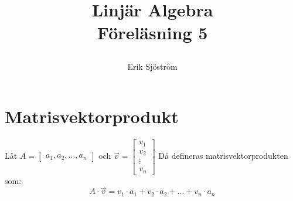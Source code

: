 
\title{
	 Linjär Algebra\\
	 Föreläsning 5
    \author{Erik Sjöström}
}

\maketitle

\section{Matrisvektorprodukt} %
\label{sec:matrisvektorprodukt}
\begin{Def}
    Låt $A = \begin{bmatrix} a_1,a_2, \dots, a_n \end{bmatrix}$ och $\vec{v} = \begin{bmatrix} v_1\\v_2\\ \vdots \\v_n \end{bmatrix}$ Då defineras matrisvektorprodukten som:
    \[
        A \cdot \vec{v} = v_1 \cdot a_1 + v_2 \cdot a_2 + \dots + v_n \cdot a_n
    \]
\end{Def}
